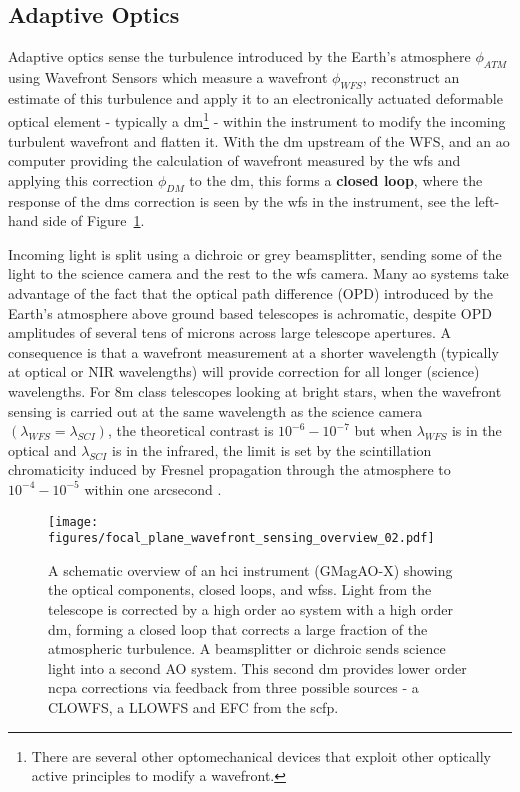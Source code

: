 \documentclass[letterpaper]{ar-1col}
\newcommand{\acc}[1]{\entry{\acs{#1}}{\acl{#1}}}
\begin{document}
\subsection{Adaptive Optics}

Adaptive optics sense the turbulence introduced by the Earth's atmosphere $\phi_{ATM}$ using Wavefront Sensors which measure a wavefront $\phi_{WFS}$, reconstruct an estimate of this turbulence and apply it to an electronically actuated deformable optical element - typically a \ac{dm}\footnote{There are several other optomechanical devices that exploit other optically active principles to modify a wavefront.} - within the instrument to modify the incoming turbulent wavefront and flatten it.
%
With the \ac{dm} upstream of the WFS, and an \ac{ao} computer providing the calculation of wavefront measured by the \ac{wfs} and applying this correction $\phi_{DM}$ to the \ac{dm}, this forms a {\bf closed loop}, where the response of the \acp{dm} correction is seen by the \ac{wfs} in the instrument, see the left-hand side of Figure~\ref{fig:aosystem}.

\begin{armarginnote}[]
\acc{dm}
\acc{wfs}
\acc{ao}
\end{armarginnote}

Incoming light is split using a dichroic or grey beamsplitter, sending some of the light to the science camera and the rest to the \ac{wfs} camera.
%
Many \ac{ao} systems take advantage of the fact that the optical path difference (OPD) introduced by the Earth's atmosphere above ground based telescopes is achromatic, despite OPD amplitudes of several tens of microns across large telescope apertures.
%
A consequence is that a wavefront measurement at a shorter wavelength (typically at optical or NIR wavelengths) will provide correction for all longer (science) wavelengths.
%
For 8m class telescopes looking at bright stars, when the wavefront sensing is carried out at the same wavelength as the science camera $(\lambda_{WFS}=\lambda_{SCI})$, the theoretical contrast is $10^{-6}-10^{-7}$ but when $\lambda_{WFS}$ is in the optical and $\lambda_{SCI}$ is in the infrared, the limit is set by the scintillation chromaticity induced by Fresnel propagation through the atmosphere to $10^{-4}-10^{-5}$ within one arcsecond \citep[see ][ for a discussion of the limits to \ac{ao} for HCI]{Guyon05-1}.

\begin{figure}[ht]
  \centering
  \texttt{[image: figures/focal\_plane\_wavefront\_sensing\_overview\_02.pdf]}
  \caption{A schematic overview of an \ac{hci} instrument (GMagAO-X) showing the optical components, closed loops, and \acp{wfs}.
  Light from the telescope is corrected by a high order \ac{ao} system with a high order \ac{dm}, forming a closed loop that corrects a large fraction of the atmospheric turbulence.
  A beamsplitter or dichroic sends science light into a second AO system.
  This second \ac{dm} provides lower order \ac{ncpa} corrections via feedback from three possible sources - a CLOWFS, a LLOWFS and EFC from the \ac{scfp}.}
  \label{fig:aosystem}
\end{figure}
\end{document}
